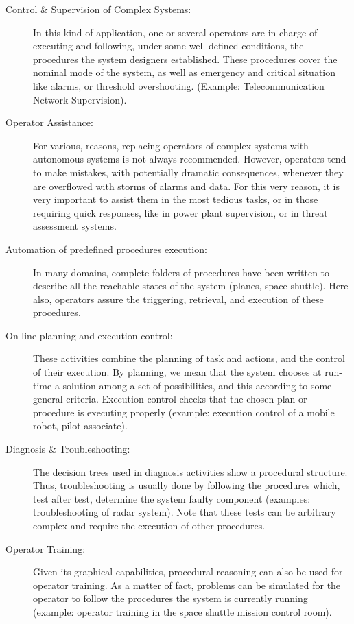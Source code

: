 \begin{description}

\item [Control \& Supervision of Complex Systems:] In this kind of
application, one or several operators are in charge of executing and
following, under some well defined conditions, the procedures the system
designers  established. These procedures cover the nominal mode of the
system, as well as emergency and critical situation like alarms, or
threshold overshooting. (Example: Telecommunication Network
Supervision).

\item [Operator Assistance:] For various, reasons, replacing operators of
complex systems with autonomous systems is not always recommended.
However, operators tend to make mistakes, with potentially dramatic
consequences, whenever they are overflowed with storms of alarms and
data. For this very reason, it is very important to assist them in the
most tedious tasks, or in those requiring quick  responses, like in power
plant supervision, or in threat assessment systems.

\item [Automation of predefined procedures execution:] In many domains,
complete folders of procedures have been written to describe all the
reachable states of the system (planes, space shuttle). Here also,
operators assure the triggering, retrieval, and execution of these
procedures.

\item [On-line planning and execution control:] These activities combine
the planning of task and actions, and the control of their execution. By
planning, we mean that the system chooses at run-time a solution among a
set of possibilities, and this according to some general criteria.
Execution control checks that the chosen plan or procedure is executing
properly (example: execution control of a mobile robot, pilot
associate).

\item [Diagnosis \& Troubleshooting:] The decision trees used in diagnosis
activities show a procedural structure. Thus, troubleshooting is usually
done by following the procedures which, test after test, determine the
system faulty component (examples: troubleshooting of radar system). Note
that these tests can be arbitrary complex and require the execution of
other procedures.

\item [Operator Training:] Given its graphical capabilities, procedural
reasoning can also be used for operator training. As a matter of fact,
problems can be simulated for the operator to follow the procedures the
system is currently running (example: operator training in the space
shuttle mission control room).

\end{description}

